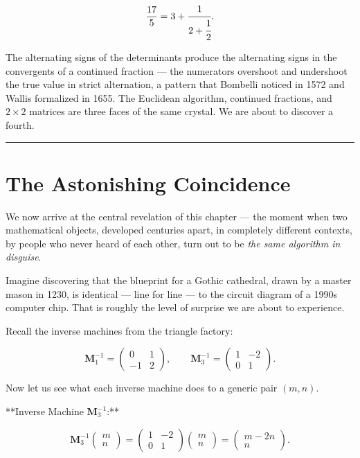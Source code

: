 \documentclass[12pt, letterpaper, openany]{book}
\theoremstyle{definition}
\theoremstyle{remark}
\begin{document}
\[
\frac{17}{5} = 3 + \cfrac{1}{2 + \cfrac{1}{2}}.
\]

The alternating signs of the determinants produce the alternating signs in the convergents of a continued fraction --- the numerators overshoot and undershoot the true value in strict alternation, a pattern that Bombelli noticed in 1572 and Wallis formalized in 1655. The Euclidean algorithm, continued fractions, and $2 \times 2$ matrices are three faces of the same crystal. We are about to discover a fourth.


\bigskip\noindent\rule{\textwidth}{0.4pt}\bigskip



\section*{The Astonishing Coincidence}


We now arrive at the central revelation of this chapter --- the moment when two mathematical objects, developed centuries apart, in completely different contexts, by people who never heard of each other, turn out to be \textit{the same algorithm in disguise}.

Imagine discovering that the blueprint for a Gothic cathedral, drawn by a master mason in 1230, is identical --- line for line --- to the circuit diagram of a 1990s computer chip. That is roughly the level of surprise we are about to experience.

Recall the inverse machines from the triangle factory:

\[
\mathbf{M}_1^{-1} = \begin{pmatrix} 0 & 1 \\ -1 & 2 \end{pmatrix}, \qquad
\mathbf{M}_3^{-1} = \begin{pmatrix} 1 & -2 \\ 0 & 1 \end{pmatrix}.
\]

Now let us see what each inverse machine does to a generic pair $(m, n)$.

**Inverse Machine $\mathbf{M}_3^{-1}$:**

\[
\mathbf{M}_3^{-1} \begin{pmatrix} m \\ n \end{pmatrix} = \begin{pmatrix} 1 & -2 \\ 0 & 1 \end{pmatrix} \begin{pmatrix} m \\ n \end{pmatrix} = \begin{pmatrix} m - 2n \\ n \end{pmatrix}.
\]
\end{document}
